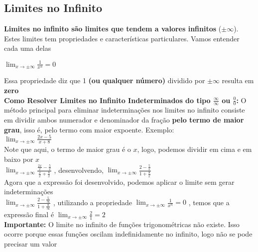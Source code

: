 \documentclass{article}
\begin{document}
\subsection{Limites no Infinito}
\textbf{Limites no infinito são limites que tendem a valores infinitos} ($\pm\infty$). Estes limites tem propriedades e características particulares. Vamos entender cada uma delas
\begin{center}
$\displaystyle \lim_{x \to \pm\infty} \frac{1}{x^{n}} = 0$
\end{center}
Essa propriedade diz que 1 \textbf{(ou qualquer número)} dividido por $\pm\infty$ resulta em \textbf{zero}
\\[10pt]
\textbf{Como Resolver Limites no Infinito Indeterminados do tipo $\frac{\infty}{\infty}$ ou $\frac{0}{0}$:} O método principal para eliminar indeterminações nos limites no infinito consiste em dividir ambos numerador e denominador da fração \textbf{pelo termo de maior grau}, isso é, pelo termo com maior expoente. Exemplo:\\[10pt]
$\displaystyle \lim_{x \to \pm\infty} \frac{2x - 5}{x + 8}$\\[10pt]
Note que aqui, o termo de maior grau é o $x$, logo, podemos dividir em cima e em baixo por $x$\\[10pt]
$\displaystyle \lim_{x \to \pm\infty} \frac{\frac{2x}{x} - \frac{5}{x}}{\frac{x}{x} + \frac{8}{x}}$ , desenvolvendo, $\displaystyle \lim_{x \to \pm\infty} \frac{2 - \frac{5}{x}}{1 + \frac{8}{x}}$\\[10pt]
Agora que a expressão foi desenvolvido, podemos aplicar o limite sem gerar indeterminações\\[10pt]
$\displaystyle \lim_{x \to \pm\infty} \frac{2 - \frac{5}{\infty}}{1 + \frac{8}{\infty}}$ , utilizando a propriedade $\displaystyle \lim_{x \to \pm\infty} \frac{1}{x^{n}} = 0$ , temos que a expressão final é $\displaystyle \lim_{x \to \pm\infty} \frac{2}{1} = 2$\\[10pt]

\noindent\textbf{Importante:} O limite no infinito de funções trigonométricas não existe. Isso ocorre porque essas funções oscilam indefinidamente no infinito, logo não se pode precisar um valor
\end{document}
